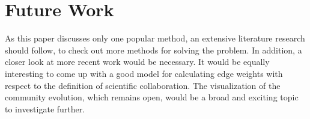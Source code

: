 \documentclass[runningheads,a4paper]{llncs}
\begin{document}
\section{Future Work}
As this paper discusses only one popular method, an extensive literature research should follow, to check out more methods for solving the problem. In addition, a closer look at more recent work would be necessary. It would be equally interesting to come up with a good model for calculating edge weights with respect to the definition of scientific collaboration. The visualization of the community evolution, which remains open, would be a broad and exciting topic to investigate further.

{
	
	
}
\end{document}
